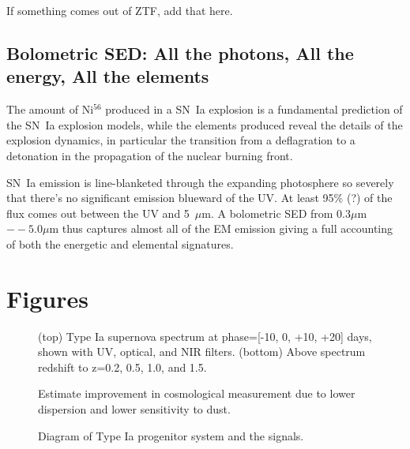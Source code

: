 \documentclass{aastex}
\newcommand{\tbd}{{\color{red}}}
\begin{document}
{\tbd If something comes out of ZTF, add that here.}

\subsection{Bolometric SED: All the photons, All the energy, All the elements}
The amount of Ni$^{56}$ produced in a SN~Ia explosion is a fundamental prediction of the SN~Ia explosion models, while the elements produced reveal the details of the explosion dynamics, in particular the transition from a deflagration to a detonation in the propagation of the nuclear burning front.

SN~Ia emission is line-blanketed through the expanding photosphere so severely that there's no significant emission blueward of the UV.  At least 95\% (?) of the flux comes out between the UV and 5~$\mu$m.  A bolometric SED from $0.3\mu$m$--5.0\mu$m thus captures almost all of the EM emission giving a full accounting of both the energetic and elemental signatures.

\section{Figures}

\begin{figure}
\caption{
    (top) Type Ia supernova spectrum at phase=[-10, 0, +10, +20] days, shown with UV, optical, and NIR filters.
    (bottom) Above spectrum redshift to z=0.2, 0.5, 1.0, and 1.5.
}
\end{figure}

\begin{figure}
\caption{Estimate improvement in cosmological measurement due to lower dispersion and lower sensitivity to dust.  }
\end{figure}

\begin{figure}
\caption{Diagram of Type Ia progenitor system and the signals.}
\end{figure}



\end{document}
